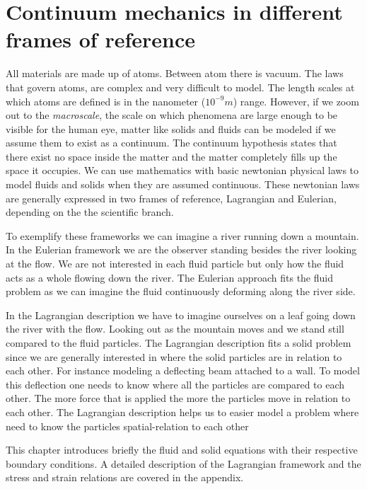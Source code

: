 \chapter{Continuum mechanics in different frames of reference}
All materials are made up of atoms. Between atom there is vacuum. The laws that govern atoms, are complex and very difficult to model. The length scales at which atoms are defined is in the nanometer ($10^{-9}m$) range. 
However, if we zoom out to the \textit{macroscale}, the scale on which phenomena are large enough to be visible for the human eye, matter like solids and fluids can be modeled if we assume them to exist as a continuum. The continuum hypothesis states that there exist no space inside the matter and the matter completely fills up the space it occupies. 
We can use mathematics with basic newtonian physical laws to model fluids and solids when they are assumed continuous. These newtonian laws are generally expressed in two frames of reference, Lagrangian and Eulerian, depending on the the scientific branch. \newline

To exemplify these frameworks we can imagine a river running down a mountain.	
In the Eulerian framework we are the observer standing besides the river looking at the flow. We are not interested in each fluid particle but only how the fluid acts as a whole flowing down the river. The Eulerian approach fits the fluid problem as we can imagine the fluid continuously deforming along the river side. \newline

In the Lagrangian description we have to imagine ourselves on a leaf going down the river with the flow. Looking out as the mountain moves and we stand still compared to the fluid particles. The Lagrangian description fits a solid problem since we are generally interested in where the solid particles are in relation to each other. For instance modeling a deflecting beam attached to a wall. To model this deflection one needs to know where all the particles are compared to each other. The more force that is applied the more the particles move in relation to each other. The Lagrangian description helps us to easier model a problem where need to know the particles spatial-relation to each other \newline

This chapter introduces briefly the fluid and solid equations with their respective boundary conditions. A detailed description of the Lagrangian framework and the stress and strain relations are covered in the appendix.

